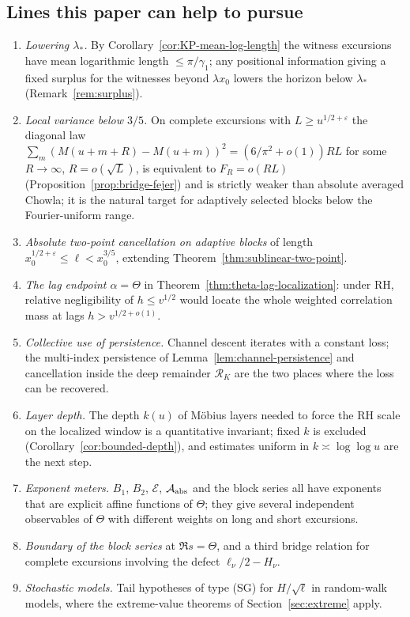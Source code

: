 \documentclass[11pt,reqno]{amsart}
\numberwithin{equation}{section}
\theoremstyle{plain}
\theoremstyle{definition}
\theoremstyle{remark}
\newcommand{\eps}{\varepsilon}
\newcommand{\En}{\mathcal{E}}
\begin{document}
\subsection*{Lines this paper can help to pursue}
\begin{enumerate}[label=\textup{(\arabic*)}]
\item \emph{Lowering $\lambda_*$.} By Corollary~\ref{cor:KP-mean-log-length}
the witness excursions have mean logarithmic length $\le\pi/\gamma_1$; any
positional information giving a fixed surplus for the witnesses beyond
$\lambda x_0$ lowers the horizon below $\lambda_*$
(Remark~\ref{rem:surplus}).
\item \emph{Local variance below $3/5$.} On complete excursions with
$L\ge u^{1/2+\eps}$ the diagonal law
$\sum_m(M(u+m+R)-M(u+m))^2=(6/\pi^2+o(1))RL$ for some $R\to\infty$,
$R=o(\sqrt L)$, is equivalent to $F_R=o(RL)$
(Proposition~\ref{prop:bridge-fejer}) and is strictly weaker than absolute
averaged Chowla; it is the natural target for adaptively selected blocks
below the Fourier-uniform range.
\item \emph{Absolute two-point cancellation on adaptive blocks} of length
$x_0^{1/2+\eps}\le\ell<x_0^{3/5}$, extending
Theorem~\ref{thm:sublinear-two-point}.
\item \emph{The lag endpoint $\alpha=\Theta$} in
Theorem~\ref{thm:theta-lag-localization}: under RH, relative negligibility
of $h\le v^{1/2}$ would locate the whole weighted correlation mass at lags
$h>v^{1/2+o(1)}$.
\item \emph{Collective use of persistence.} Channel descent iterates with a
constant loss; the multi-index persistence of
Lemma~\ref{lem:channel-persistence} and cancellation inside the deep
remainder $\mathcal R_K$ are the two places where the loss can be recovered.
\item \emph{Layer depth.} The depth $k(u)$ of Möbius layers needed to force
the RH scale on the localized window is a quantitative invariant; fixed $k$
is excluded (Corollary~\ref{cor:bounded-depth}), and estimates uniform in
$k\asymp\log\log u$ are the next step.
\item \emph{Exponent meters.} $B_1$, $B_2$, $\En$, $\mathcal A_{\rm abs}$
and the block series all have exponents that are explicit affine functions
of $\Theta$; they give several independent observables of $\Theta$ with
different weights on long and short excursions.
\item \emph{Boundary of the block series} at $\Re s=\Theta$, and a third
bridge relation for complete excursions involving the defect
$\ell_\nu/2-H_\nu$.
\item \emph{Stochastic models.} Tail hypotheses of type (SG) for
$H/\sqrt\ell$ in random-walk models, where the extreme-value theorems of
Section~\ref{sec:extreme} apply.
\end{enumerate}
\end{document}
